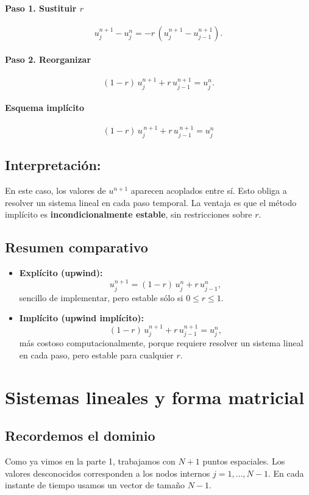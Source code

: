 \documentclass[12pt,a4paper]{article}
\begin{document}
\paragraph{Paso 1. Sustituir $r$}  
\[
u_j^{n+1} - u_j^n = -r\,(u_j^{n+1} - u_{j-1}^{n+1}).
\]

\paragraph{Paso 2. Reorganizar}  
\[
(1-r)\,u_j^{n+1} + r\,u_{j-1}^{n+1} = u_j^n.
\]

\paragraph{Esquema implícito}  
\[
\boxed{(1-r)\,u_j^{\,n+1} + r\,u_{j-1}^{\,n+1} = u_j^n}
\]

\subsection*{Interpretación:}
En este caso, los valores de $u^{n+1}$ aparecen acoplados entre sí.  
Esto obliga a resolver un sistema lineal en cada paso temporal.  
La ventaja es que el método implícito es \textbf{incondicionalmente estable}, sin restricciones sobre $r$.

\subsection{Resumen comparativo}

\begin{itemize}
    \item \textbf{Explícito (upwind):}  
    \[
    u_j^{n+1} = (1-r)\,u_j^n + r\,u_{j-1}^n,
    \]
    sencillo de implementar, pero estable sólo si $0 \leq r \leq 1$.

    \item \textbf{Implícito (upwind implícito):}  
    \[
    (1-r)\,u_j^{n+1} + r\,u_{j-1}^{n+1} = u_j^n,
    \]
    más costoso computacionalmente, porque requiere resolver un sistema lineal en cada paso, pero estable para cualquier $r$.
\end{itemize}

\section{Sistemas lineales y forma matricial}

\subsection{Recordemos el dominio}
Como ya vimos en la parte 1, trabajamos con $N+1$ puntos espaciales.  
Los valores desconocidos corresponden a los nodos internos $j=1,\dots,N-1$. En cada instante de tiempo usamos un vector de tamaño $N-1$.
\end{document}

